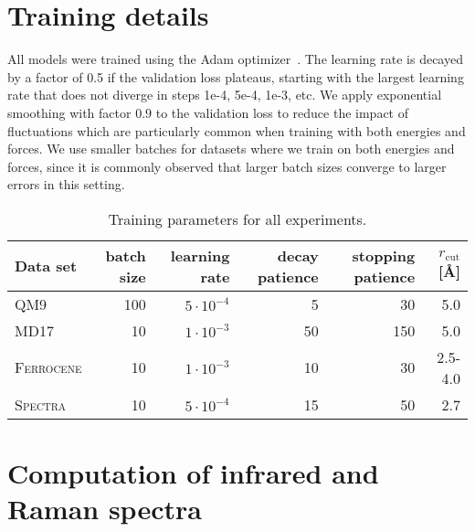 \documentclass[reprint,
amsmath,amssymb,
 aip,jcp
]{revtex4-2}
\begin{document}
\section{Training details}
All models were trained using the Adam optimizer~\cite{kingma2014adam}.
The learning rate is decayed by a factor of 0.5 if the validation loss plateaus, starting with the largest learning rate that does not diverge in steps 1e-4, 5e-4, 1e-3, etc.
We apply exponential smoothing with factor $0.9$ to the validation loss to reduce the impact of fluctuations which are particularly common when training with both energies and forces.
We use smaller batches for datasets where we train on both energies and forces, since it is commonly observed that larger batch sizes converge to larger errors in this setting.

\begin{table*}[htb]
\caption{Training parameters for all experiments.}
\label{tab:md17}
\begin{center}
\begin{scriptsize}
\begin{sc}
\begin{tabular}{lrrrrr}
\toprule
Data set & batch size & learning rate & decay patience & stopping patience & $r_\text{cut}$ [\AA]\\ 
\midrule
\textsc{QM9} & 100 & $5 \cdot 10^{-4}$ & 5 & 30 & 5.0 \\
\textsc{MD17} & 10 & $1 \cdot 10^{-3}$ & 50 & 150 & 5.0  \\
\textsc{Ferrocene} & 10 & $1 \cdot 10^{-3}$ & 10 & 30 & 2.5-4.0 \\
\textsc{Spectra} & 10 & $5 \cdot 10^{-4}$ & 15 & 50 & 2.7 \\
\bottomrule
\end{tabular}
\end{sc}
\end{scriptsize}
\end{center}
\vskip -0.1in
\end{table*}

\section{Computation of infrared and Raman spectra}
\end{document}
